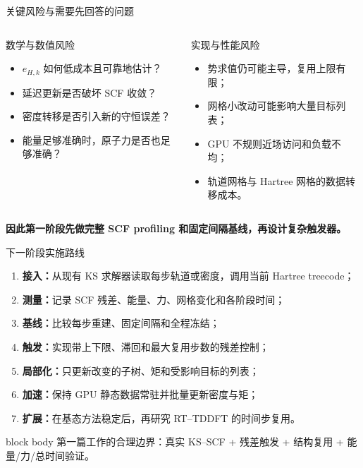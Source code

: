 \documentclass[aspectratio=169,11pt]{beamer}
\begin{document}
\begin{frame}{关键风险与需要先回答的问题}
  \begin{columns}[T,onlytextwidth]
      \begin{block}{数学与数值风险}
        \small
        \begin{itemize}\setlength\itemsep{0.4em}
          \item $e_{H,k}$ 如何低成本且可靠地估计？
          \item 延迟更新是否破坏 SCF 收敛？
          \item 密度转移是否引入新的守恒误差？
          \item 能量足够准确时，原子力是否也足够准确？
        \end{itemize}
      \end{block}
      \begin{block}{实现与性能风险}
        \small
        \begin{itemize}\setlength\itemsep{0.4em}
          \item 势求值仍可能主导，复用上限有限；
          \item 网格小改动可能影响大量目标列表；
          \item GPU 不规则近场访问和负载不均；
          \item 轨道网格与 Hartree 网格的数据转移成本。
        \end{itemize}
      \end{block}
  \end{columns}

  \vspace{0.25cm}
  \centering\color{navy}\bfseries
  因此第一阶段先做完整 SCF profiling 和固定间隔基线，再设计复杂触发器。
\end{frame}

\begin{frame}{下一阶段实施路线}
  \small
  \begin{enumerate}\setlength\itemsep{0.48em}
    \item \textbf{接入：}从现有 KS 求解器读取每步轨道或密度，调用当前 Hartree treecode；
    \item \textbf{测量：}记录 SCF 残差、能量、力、网格变化和各阶段时间；
    \item \textbf{基线：}比较每步重建、固定间隔和全程冻结；
    \item \textbf{触发：}实现带上下限、滞回和最大复用步数的残差控制；
    \item \textbf{局部化：}只更新改变的子树、矩和受影响目标的列表；
    \item \textbf{加速：}保持 GPU 静态数据常驻并批量更新密度与矩；
    \item \textbf{扩展：}在基态方法稳定后，再研究 RT--TDDFT 的时间步复用。
  \end{enumerate}

  \vspace{0.35cm}
  \begin{beamercolorbox}[rounded=true,sep=0.45em,wd=0.94\textwidth]{block body}
    \centering
    第一篇工作的合理边界：真实 KS--SCF + 残差触发 + 结构复用 + 能量/力/总时间验证。
  \end{beamercolorbox}
\end{frame}
\end{document}
